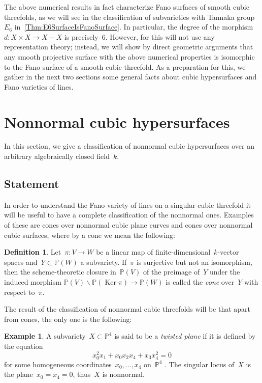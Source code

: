 \documentclass[a4paper]{amsart}
\newcommand{\bbP}{\mathbb{P}}
\renewcommand{\ker}{\Ker}
\DeclareMathOperator{\Ker}{Ker}
\theoremstyle{plain}
\theoremstyle{definition}
\newtheorem{definition}[theorem]{Definition}
\newtheorem{example}[theorem]{Example}
\numberwithin{equation}{section}
\begin{document}
The above numerical results in fact characterize Fano surfaces of smooth cubic threefolds, as we will see in the classification of subvarieties with Tannaka group~$E_6$ in~\cref{Thm:E6SurfaceIsFanoSurface}. In particular, the degree of the morphism~$d\colon X\times X \to X-X$ is precisely~$6$. However, for this will not use any representation theory; instead, we will show by direct geometric arguments that any smooth projective surface with the above numerical properties is isomorphic to the Fano surface of a smooth cubic threefold. As a preparation for this, we gather in the next two sections some general facts about cubic hypersurfaces and Fano varieties of lines.

\section{Nonnormal cubic hypersurfaces}

In this section, we give a classification of nonnormal cubic hypersurfaces over an arbitrary algebraically closed field~$k$. 

\subsection{Statement}

In order to understand the Fano variety of lines on a singular cubic threefold it will be useful to have a complete classification of the nonnormal ones. Examples of these are cones over nonnormal cubic plane curves and cones over nonnormal cubic surfaces, where by a cone we mean the following: 

\begin{definition} Let~$\pi \colon V \to W$ be a linear map of finite-dimensional~$k$-vector spaces and~$Y \subset \bbP(W)$ a subvariety. If~$\pi$ is surjective but not an isomorphism, then the scheme-theoretic closure in~$\bbP(V)$ of the preimage of~$Y$ under the induced morphism $\bbP(V) \smallsetminus \bbP(\ker \pi) \to \bbP(W)$ is called the \emph{cone} over~$Y$ with respect to~$\pi$.
\end{definition}

The result of the classification of nonnormal cubic threefolds will be that apart from cones, the only one is the following:

\begin{example} \label{Ex:TwistedPlane} A subvariety~$X \subset \bbP^4$ is said to be a \emph{twisted plane} if it is defined by the equation
\[  x_0^2 x_1+x_0 x_2 x_4+x_3 x_4^2=0 \]
for some homogeneous coordinates~$x_0, \dots, x_4$ on~$\bbP^4$ \cite[sect.~2.2.9]{RuledVarieties}. The singular locus of~$X$ is the plane~$x_0=x_4= 0$, thus~$X$ is nonnormal.
\end{example}
\end{document}
